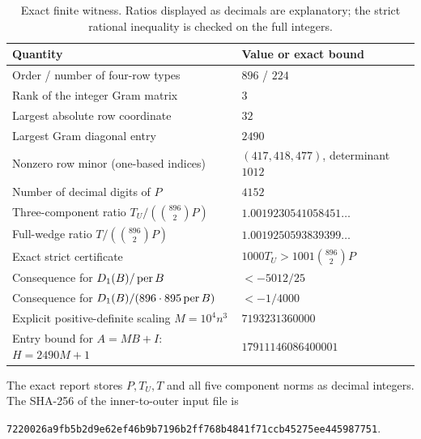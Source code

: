 \begin{table}[htbp]
\centering
\caption{Exact finite witness. Ratios displayed as decimals are explanatory;
the strict rational inequality is checked on the full integers.}
\label{tab:witness}
\begin{tabular}{@{}ll@{}}
\toprule
Quantity & Value or exact bound\\
\midrule
Order / number of four-row types & $896$ / $224$\\
Rank of the integer Gram matrix & $3$\\
Largest absolute row coordinate & $32$\\
Largest Gram diagonal entry & $2490$\\
Nonzero row minor (one-based indices) & $(417,418,477)$, determinant $1012$\\
Number of decimal digits of $P$ & $4152$\\
Three-component ratio $T_U/(\binom{896}{2}P)$ & $1.0019230541058451\ldots$\\
Full-wedge ratio $T/(\binom{896}{2}P)$ & $1.0019250593839399\ldots$\\
Exact strict certificate & $1000T_U>1001\binom{896}{2}P$\\
Consequence for $D_1(B)/\operatorname{per} B$ & $<-5012/25$\\
Consequence for $D_1(B)/(896\cdot895\operatorname{per} B)$ & $<-1/4000$\\
Explicit positive-definite scaling $M=10^4n^3$ & $7193231360000$\\
Entry bound for $A=MB+I$: $H=2490M+1$ & $17911146086400001$\\
\bottomrule
\end{tabular}
\end{table}

The exact report stores $P,T_U,T$ and all five component norms as decimal
integers. The SHA-256 of the inner-to-outer input file is
\begin{center}\small\texttt{7220026a9fb5b2d9e62ef46b9b7196b2ff768b4841f71ccb45275ee445987751}.\end{center}
